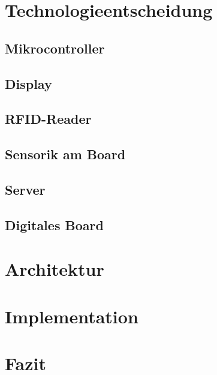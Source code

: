 \documentclass[12pt,titlepage]{scrartcl}
\begin{document}
	\section{Technologieentscheidung}
		\subsection{Mikrocontroller}
		\subsection{Display}
		\subsection{RFID-Reader}
		\subsection{Sensorik am Board}
		\subsection{Server}
		\subsection{Digitales Board} \label{Digitales Board}
	\newpage	
	\section{Architektur}
	\newpage
	\section{Implementation}
	\newpage	
	\section{Fazit}
	\newpage

	

 	
\end{document}
